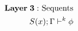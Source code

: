 \documentclass[preview]{standalone}
\begin{document}
\begin{align*}
\special{dvisvgm:raw <g id='unique000'>}\mathbf{Layer\;3:}\text{ Sequents}\\S(x);\Gamma\vdash^k\phi\special{dvisvgm:raw </g>}
\end{align*}
\end{document}

